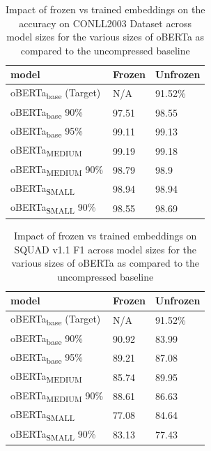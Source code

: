 \begin{table}[!ht]
    \centering
    \begin{tabular}{|l|l|l|}
    \hline
     model & Frozen & Unfrozen \\ \hline
        oBERTa\textsubscript{base} (Target) & N/A & 91.52\% \\ \hline
        oBERTa\textsubscript{base} 90\% & 97.51 & 98.55 \\ \hline
        oBERTa\textsubscript{base} 95\% & 99.11 & 99.13 \\ \hline
        oBERTa\textsubscript{MEDIUM} & 99.19 & 99.18 \\ \hline
        oBERTa\textsubscript{MEDIUM} 90\% & 98.79 & 98.9 \\ \hline
        oBERTa\textsubscript{SMALL} & 98.94 & 98.94 \\ \hline
        oBERTa\textsubscript{SMALL} 90\% & 98.55 & 98.69 \\ \hline
    \end{tabular}
    \caption{Impact of frozen vs trained embeddings on the accuracy on CONLL2003 Dataset across model sizes for the various sizes of oBERTa as compared to the uncompressed baseline}
    \label{tab:CONLL-freeze}
\end{table}

\begin{table}[!ht]
    \centering
    \begin{tabular}{|l|l|l|}
    \hline
        model & Frozen & Unfrozen \\ \hline
        oBERTa\textsubscript{base} (Target) & N/A & 91.52\% \\ \hline
        oBERTa\textsubscript{base} 90\% & 90.92 & 83.99 \\ \hline
        oBERTa\textsubscript{base} 95\% & 89.21 & 87.08 \\ \hline
        oBERTa\textsubscript{MEDIUM} & 85.74 & 89.95 \\ \hline
        oBERTa\textsubscript{MEDIUM} 90\% & 88.61 & 86.63 \\ \hline
        oBERTa\textsubscript{SMALL} & 77.08 & 84.64 \\ \hline
        oBERTa\textsubscript{SMALL} 90\% & 83.13 & 77.43 \\ \hline
    \end{tabular}
    \caption{Impact of frozen vs trained embeddings on SQUAD v1.1 F1 across model sizes for the various sizes of oBERTa as compared to the uncompressed baseline}
    \label{tab:squad-freeze}
\end{table}

